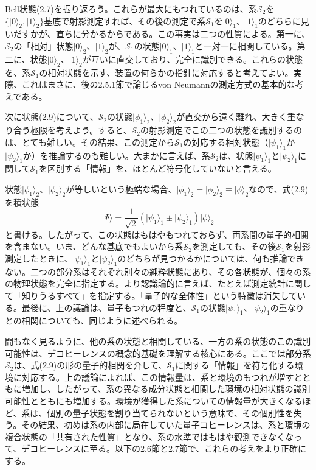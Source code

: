 Bell状態(2.7)を振り返ろう。これらが最大にもつれているのは、系$\mathcal S_2$を$\{\lvert0\rangle_2,\lvert1\rangle_2\}$基底で射影測定すれば、その後の測定で系$\mathcal S_1$を$\lvert0\rangle_1$、$\lvert1\rangle_1$のどちらに見いだすかが、直ちに分かるからである。この事実は二つの性質による。第一に、$\mathcal S_2$の「相対」状態$\lvert0\rangle_2$、$\lvert1\rangle_2$が、$\mathcal S_1$の状態$\lvert0\rangle_1$、$\lvert1\rangle_1$と一対一に相関している。第二に、状態$\lvert0\rangle_2$、$\lvert1\rangle_2$が互いに直交しており、完全に識別できる。これらの状態を、系$\mathcal S_1$の相対状態を示す、装置の何らかの指針に対応すると考えてよい。実際、これはまさに、後の2.5.1節で論じるvon Neumannの測定方式の基本的な考えである。

\hypertarget{srcpage:33}{}\label{srcpage:33}
次に状態(2.9)について、$\mathcal S_2$の状態$\lvert\phi_1\rangle_2$、$\lvert\phi_2\rangle_2$が直交から遠く離れ、大きく重なり合う極限を考えよう。すると、$\mathcal S_2$の射影測定でこの二つの状態を識別するのは、とても難しい。その結果、この測定から$\mathcal S_1$の対応する相対状態（$\lvert\psi_1\rangle_1$か$\lvert\psi_2\rangle_1$か）を推論するのも難しい。大まかに言えば、系$\mathcal S_2$は、状態$\lvert\psi_1\rangle_1$と$\lvert\psi_2\rangle_1$に関して$\mathcal S_1$を区別する「情報」を、ほとんど符号化していないと言える。

状態$\lvert\phi_1\rangle_2$、$\lvert\phi_2\rangle_2$が等しいという極端な場合、$\lvert\phi_1\rangle_2=\lvert\phi_2\rangle_2\equiv\lvert\phi\rangle_2$なので、式(2.9)を積状態
\begin{equation}\lvert\Psi\rangle=\frac1{\sqrt2}(\lvert\psi_1\rangle_1\pm\lvert\psi_2\rangle_1)\lvert\phi\rangle_2\tag{2.10}\end{equation}
と書ける。したがって、この状態はもはやもつれておらず、両系間の量子的相関を含まない。いま、どんな基底でもよいから系$\mathcal S_2$を測定しても、その後$\mathcal S_1$を射影測定したときに、$\lvert\psi_1\rangle_1$と$\lvert\psi_2\rangle_1$のどちらが見つかるかについては、何も推論できない。二つの部分系はそれぞれ別々の純粋状態にあり、その各状態が、個々の系の物理状態を完全に指定する。より認識論的に言えば、たとえば測定統計に関して「知りうるすべて」を指定する。「量子的な全体性」という特徴は消失している。最後に、上の議論は、量子もつれの程度と、$\mathcal S_1$の状態$\lvert\psi_1\rangle_1$、$\lvert\psi_2\rangle_1$の重なりとの相関についても、同じように述べられる。

間もなく見るように、他の系の状態と相関している、一方の系の状態のこの識別可能性は、デコヒーレンスの概念的基礎を理解する核心にある。ここでは部分系$\mathcal S_2$は、式(2.9)の形の量子的相関を介して、$\mathcal S_1$に関する「情報」を符号化する環境に対応する。上の議論によれば、この情報量は、系と環境のもつれが増すとともに増加し、したがって、系の異なる成分状態と相関した環境の相対状態の識別可能性とともにも増加する。環境が獲得した系についての情報量が大きくなるほど、系は、個別の量子状態を割り当てられないという意味で、その個別性を失う。その結果、初めは系の内部に局在していた量子コヒーレンスは、系と環境の複合状態の「共有された性質」となり、系の水準ではもはや観測できなくなって、デコヒーレンスに至る。以下の2.6節と2.7節で、これらの考えをより正確にする。
